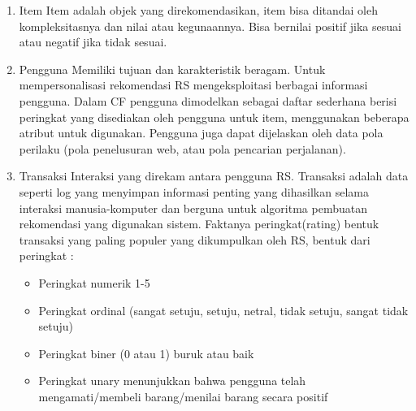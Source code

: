 \documentclass[a4paper,twoside]{article}
\begin{document}
\begin{enumerate}
		\begin{enumerate}
			\item Item
				Item adalah objek yang direkomendasikan, item bisa ditandai oleh kompleksitasnya dan nilai atau kegunaannya. Bisa bernilai positif jika sesuai atau negatif jika tidak sesuai.
			\item Pengguna
				Memiliki tujuan dan karakteristik beragam. Untuk mempersonalisasi rekomendasi RS mengeksploitasi berbagai informasi pengguna. Dalam CF pengguna dimodelkan sebagai daftar sederhana berisi peringkat yang disediakan oleh pengguna untuk item, menggunakan beberapa atribut untuk digunakan. Pengguna juga dapat dijelaskan oleh data pola perilaku (pola penelusuran web, atau pola  pencarian perjalanan).
			\item Transaksi
				Interaksi yang direkam antara pengguna RS. Transaksi adalah data seperti log yang menyimpan informasi penting yang dihasilkan selama interaksi manusia-komputer dan berguna untuk algoritma pembuatan rekomendasi yang digunakan sistem. Faktanya peringkat(rating) bentuk transaksi yang paling populer yang dikumpulkan oleh RS, bentuk dari peringkat :
				\begin{itemize}
					\item Peringkat numerik 1-5
					\item Peringkat ordinal (sangat setuju, setuju, netral, tidak setuju, sangat tidak setuju)
					\item Peringkat biner (0 atau 1) buruk atau baik
					\item Peringkat unary menunjukkan bahwa pengguna telah mengamati/membeli barang/menilai barang secara positif
				\end{itemize}
		\end{enumerate}		 
		

\end{enumerate}
\end{document}
